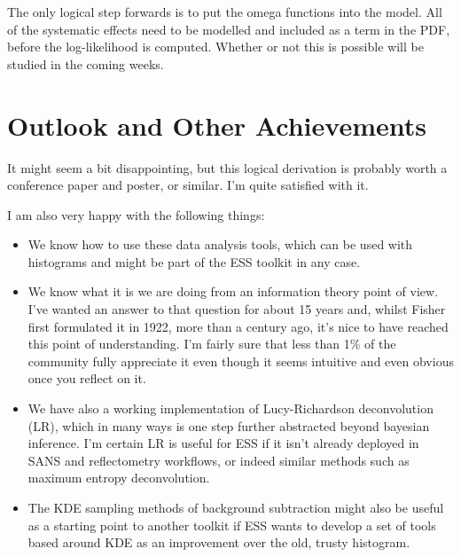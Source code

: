 \documentclass{article}
\begin{document}
The only logical step forwards is to put the omega functions into the
model.  All of the systematic effects need to be modelled and included
as a term in the PDF, before the log-likelihood is computed.  Whether
or not this is possible will be studied in the coming weeks.



\section{Outlook and Other Achievements}
It might seem a bit disappointing, but this logical derivation is
probably worth a conference paper and poster, or similar.
I'm quite satisfied with it.

I am also very happy with the following things:
\begin{itemize}
\item We know how to use these data analysis tools, which can be used
  with histograms and might be part of the ESS toolkit in any case.
\item We know what it is we are doing from an information theory point
  of view.  I've wanted an answer to that question for about 15 years
  and, whilst Fisher first formulated it in 1922, more than a century
  ago, it's nice to have reached this point of understanding.  I'm
  fairly sure that less than 1\% of the community fully appreciate it
  even though it seems intuitive and even obvious once you reflect on
  it.
\item We have also a working implementation of Lucy-Richardson
  deconvolution (LR), which in many ways is one step further
  abstracted beyond bayesian inference.  I'm certain LR is useful for
  ESS if it isn't already deployed in SANS and reflectometry
  workflows, or indeed similar methods such as maximum entropy
  deconvolution.
\item The KDE sampling methods of background subtraction might also be
  useful as a starting point to another toolkit if ESS wants to
  develop a set of tools based around KDE as an improvement over the
  old, trusty histogram.
\end{itemize}
\end{document}
